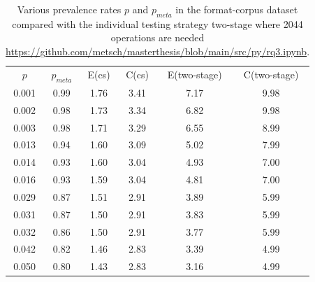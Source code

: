 \begin{table}[H]
    \caption{Various prevalence rates $p$ and $p_{meta}$ in the format-corpus dataset compared with the individual testing strategy \acrshort{two-stage} where 2044 operations are needed \url{https://github.com/metsch/masterthesis/blob/main/src/py/rq3.ipynb}.}
    \centering
    \begin{tabular}{c c c c c c}
    \label{tb:split-off}
    $p$ & $p_{meta}$ & E(\acrshort{cs}) & C(\acrshort{cs}) & E(\acrshort{two-stage}) & C(\acrshort{two-stage})\\
	0.001 &	0.99 &	1.76 & 3.41 &	7.17&	9.98 \\
	0.002 &	0.98 &	1.73 & 3.34 &	6.82&	9.98 \\
	0.003 &	0.98 &	1.71 & 3.29 &	6.55&	8.99 \\
	0.013 &	0.94 &	1.60 & 3.09 &	5.02&	7.99 \\
	0.014 &	0.93 &	1.60 & 3.04 &	4.93&	7.00 \\
	0.016 &	0.93 &	1.59 & 3.04 &	4.81&	7.00 \\
	0.029 &	0.87 &	1.51 & 2.91 &	3.89&	5.99 \\
	0.031 &	0.87 &	1.50 & 2.91 &	3.83&	5.99 \\
	0.032 &	0.86 &	1.50 & 2.91 &	3.77&	5.99 \\
    0.042 &	0.82 &	1.46 & 2.83 &	3.39&	4.99 \\
	0.050 &	0.80 &	1.43 & 2.83 &	3.16&	4.99
    \end{tabular}
\end{table}

